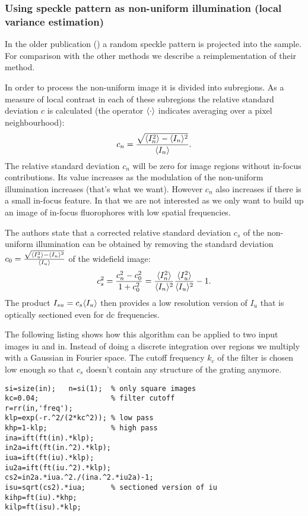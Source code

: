 \subsubsection{Using speckle pattern as non-uniform illumination (local variance estimation)}
In the older publication (\cite{2008Lim}) a random speckle pattern is
projected into the sample. For comparison with the other methods we
describe a reimplementation of their method.

In order to process the non-uniform image it is divided into
subregions.  As a measure of local contrast in each of these
subregions the relative standard deviation $c$ is calculated (the
operator $\langle \cdot \rangle$ indicates averaging over a pixel
neighbourhood):
\begin{align}
  c_n=\frac{\sqrt{\langle I_n^2 \rangle-\langle I_n \rangle^2}}{\langle I_n \rangle}.
\end{align}
The relative standard deviation $c_n$ will be zero for image regions
without in-focus contributions. Its value increases as the modulation
of the non-uniform illumination increases (that's what we
want). However $c_n$ also increases if there is a small in-focus
feature. In that we are not interested as we only want to build up an
image of in-focus fluorophores with low spatial frequencies. 

The authors state that a corrected relative standard deviation $c_s$
of the non-uniform illumination can be obtained by removing the
standard deviation
$c_0=\frac{\sqrt{\langle I_u^2 \rangle-\langle I_u \rangle^2}}{\langle I_u \rangle}$ of the
widefield image:
\begin{align} 
  c_s^2=\frac{c_n^2-c_0^2}{1+c_0^2}
  =
  \frac{\langle I_n^2 \rangle}{\langle I_n \rangle^2}
  \frac{\langle I_u^2 \rangle}{\langle I_u \rangle^2}-1.
\end{align}
The product $I_{su}=c_s\langle I_u \rangle$ then provides a low resolution
version of $I_u$ that is optically sectioned even for dc frequencies.

The following listing shows how this algorithm can be applied to two
input images {\sf iu} and {\sf in}. Instead of doing a discrete
integration over regions we multiply with a Gaussian in Fourier
space. The cutoff frequency $k_c$ of the filter is chosen low enough
so that $c_s$ doesn't contain any structure of the grating anymore.
\begin{lstlisting}
si=size(in);   n=si(1);  % only square images
kc=0.04;                 % filter cutoff
r=rr(in,'freq');
klp=exp(-r.^2/(2*kc^2)); % low pass
khp=1-klp;               % high pass
ina=ift(ft(in).*klp);
in2a=ift(ft(in.^2).*klp);
iua=ift(ft(iu).*klp);
iu2a=ift(ft(iu.^2).*klp);
cs2=in2a.*iua.^2./(ina.^2.*iu2a)-1;
isu=sqrt(cs2).*iua;      % sectioned version of iu
kihp=ft(iu).*khp;
kilp=ft(isu).*klp;
\end{lstlisting}

